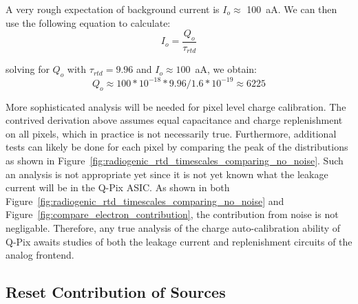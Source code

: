 A very rough expectation of background current is $I_o \approx$ 100~\unit{aA}.
We can then use the following equation to calculate:
$$
I_{o} = \frac{Q_{o}}{\tau_{rtd}}
$$

solving for $Q_{o}$ with $\tau_{rtd} = 9.96$ and $I_{o} \approx 100$~\unit{aA}, we obtain:
$$
Q_{o} \approx 100*10^{-18} * 9.96 / 1.6*10^{-19} \approx 6225
$$

More sophisticated analysis will be needed for pixel level charge calibration.
The contrived derivation above assumes equal capacitance and charge replenishment on all pixels, which in practice is not necessarily true.
Furthermore, additional tests can likely be done for each pixel by comparing the peak of the distributions as shown in Figure~\ref{fig:radiogenic_rtd_timescales_comparing_no_noise}.
Such an analysis is not appropriate yet since it is not yet known what the leakage current will be in the Q-Pix ASIC.
As shown in both Figure~\ref{fig:radiogenic_rtd_timescales_comparing_no_noise} and Figure~\ref{fig:compare_electron_contribution}, the contribution from noise is not negligable.
Therefore, any true analysis of the charge auto-calibration ability of Q-Pix awaits studies of both the leakage current and replenishment circuits of the analog frontend.

\subsection{Reset Contribution of Sources}

